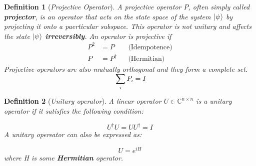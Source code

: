 \documentclass[12pt,a4paper]{report}
\newtheorem{definition}{Definition}
\begin{document}
\begin{definition}[\emph{Projective Operator}]
A projective operator \(P\), often simply called \textbf{projector}, is an operator that acts on the state space of the system $\ket{\psi}$ by projecting it onto a paerticular subspace. This operator is not unitary and affects the state \(\ket{\psi}\) \textbf{irreversibly}. An operator is projective if
\begin{equation}
\begin{aligned}
P^2 &= P && \text{(Idempotence)} \\
P &= P^\dagger && \text{(Hermitian)}
\end{aligned}
\end{equation}
Projective operators are also mutually orthogonal and they form a \emph{complete set}.
\begin{equation}
    \sum_i P_i = \mathit{I}
\end{equation}
\end{definition}

\begin{definition}[\emph{Unitary operator}]
A linear operator $U \in \mathbb{C}^{n \times n}$ is a unitary operator if it satisfies the following condition:

\begin{equation}
    U^{\dagger}U = UU^{\dagger} = \mathit{I}
\end{equation}
A unitary opereator can also be expressed as:

\begin{equation}
    U = e^{iH}
\end{equation}
where H is some \textbf{Hermitian} operator.
\end{definition}
\end{document}
